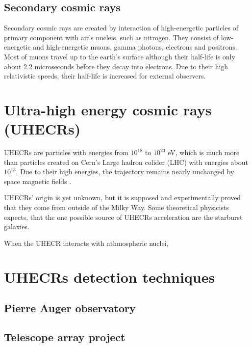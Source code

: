 \subsection{Secondary cosmic rays}
Secondary cosmic rays are created by interaction of high-energetic particles of primary component with air's nucleis, such as nitrogen. They consist of low-energetic and high-energetic muons, gamma photons, electrons and positrons. Most of muons travel up to the earth's surface although their half-life is only about 2.2 microseconds before they decay into electrons. Due to their high relativistic speeds, their half-life is increased for external observers. 




\section{Ultra-high energy cosmic rays (UHECRs)}
UHECRs are particles with energies from $10^{18}$ to $10^{20}$ eV, which is much more than particles created on Cern's Large hadron colider (LHC) with energies about $10^{13}$. Due to their high energies, the trajectory remains nearly unchanged by space magnetic fields \cite{Benjamin_Skuse}.
\par
UHECRs' origin is yet unknown, but it is supposed and experimentally proved that they come from outside of the Milky Way. Some theoretical physicists expects, that the one possible source of UHECRs acceleration are the starburst galaxies.
\par
When the UHECR interacts with athmospheric nuclei,

\section{UHECRs detection techniques}


\subsection{Pierre Auger observatory}

\subsection{Telescope array project}

